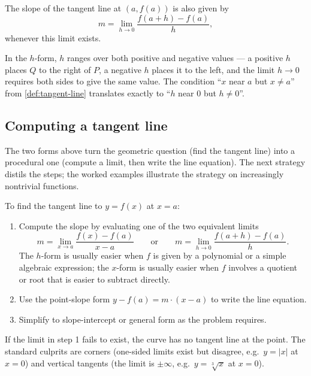 \begin{proposition}\label{prop:tangent-h-form}
The slope of the tangent line at \((a, f(a))\) is also given by
\[
m = \lim_{h \to 0} \frac{f(a + h) - f(a)}{h},
\]
whenever this limit exists.
\end{proposition}

\begin{caution}
In the \(h\)-form, \(h\) ranges over both positive and negative values --- a positive \(h\) places \(Q\) to the right of \(P\), a negative \(h\) places it to the left, and the limit \(h \to 0\) requires both sides to give the same value. The condition ``\(x\) near \(a\) but \(x \neq a\)'' from \cref{def:tangent-line} translates exactly to ``\(h\) near \(0\) but \(h \neq 0\)''.
\end{caution}

\subsection{Computing a tangent line}

The two forms above turn the geometric question (find the tangent line) into a procedural one (compute a limit, then write the line equation). The next strategy distils the steps; the worked examples illustrate the strategy on increasingly nontrivial functions.

\begin{strategy}
To find the tangent line to \(y = f(x)\) at \(x = a\):
\begin{enumerate}
    \item Compute the slope by evaluating one of the two equivalent limits
    \[
    m = \lim_{x \to a} \frac{f(x) - f(a)}{x - a}
    \qquad \text{or} \qquad
    m = \lim_{h \to 0} \frac{f(a + h) - f(a)}{h}.
    \]
    The \(h\)-form is usually easier when \(f\) is given by a polynomial or a simple algebraic expression; the \(x\)-form is usually easier when \(f\) involves a quotient or root that is easier to subtract directly.
    \item Use the point-slope form \(y - f(a) = m \cdot (x - a)\) to write the line equation.
    \item Simplify to slope-intercept or general form as the problem requires.
\end{enumerate}
If the limit in step 1 fails to exist, the curve has no tangent line at the point. The standard culprits are corners (one-sided limits exist but disagree, e.g.\ \(y = \lvert x \rvert\) at \(x = 0\)) and vertical tangents (the limit is \(\pm \infty\), e.g.\ \(y = \sqrt[3]{x}\) at \(x = 0\)).
\end{strategy}

